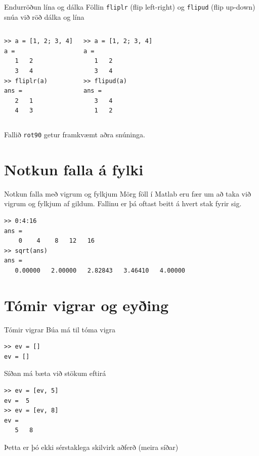 \documentclass[handout]{beamer}
\begin{document}
\begin{frame}[fragile]{Endurröðun lína og dálka}
\vspace{\baselineskip}
Föllin \texttt{fliplr} (flip left-right) og \texttt{flipud} (flip up-down) snúa við röð dálka og lína
\begin{columns}
\begin{verbatim}
>> a = [1, 2; 3, 4]
a =
   1   2
   3   4
>> fliplr(a)
ans =
   2   1
   4   3
\end{verbatim}
\begin{verbatim}
>> a = [1, 2; 3, 4]
a =
   1   2
   3   4
>> flipud(a)
ans =
   3   4
   1   2
\end{verbatim}
\end{columns}
\vspace{0.5\baselineskip}
Fallið \texttt{rot90} getur framkvæmt aðra snúninga.
\end{frame}

\section{Notkun falla á fylki}

\begin{frame}[fragile]{Notkun falla með vigrum og fylkjum}
Mörg föll í Matlab eru fær um að taka við vigrum og fylkjum af gildum. Fallinu er þá oftast beitt á hvert stak fyrir sig.
\begin{verbatim}
>> 0:4:16
ans =
    0    4    8   12   16
>> sqrt(ans)
ans =
   0.00000   2.00000   2.82843   3.46410   4.00000
\end{verbatim}
\end{frame}

\section{Tómir vigrar og eyðing}

\begin{frame}[fragile]{Tómir vigrar}
Búa má til tóma vigra
\begin{verbatim}
>> ev = []
ev = []
\end{verbatim}
Síðan má bæta við stökum eftirá
\begin{verbatim}
>> ev = [ev, 5]
ev =  5
>> ev = [ev, 8]
ev =
   5   8
\end{verbatim}
Þetta er þó ekki sérstaklega skilvirk aðferð (meira síðar)
\end{frame}
\end{document}
